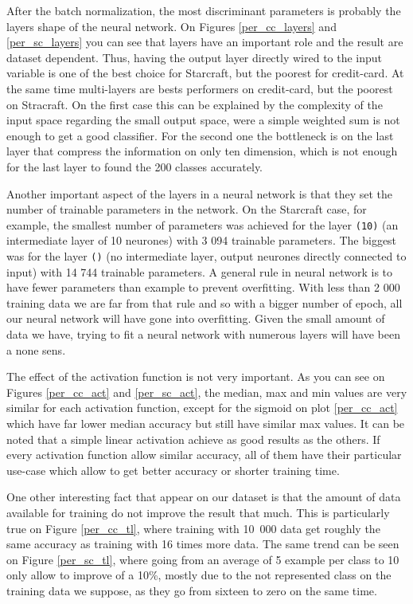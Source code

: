 \documentclass[twocolumn,a4paper,10pt]{article}
\begin{document}
After the batch normalization, the most discriminant parameters is
probably the layers shape of the neural network. On Figures \ref{per_cc_layers}
and \ref{per_sc_layers} you can see that layers have an important
role and the result are dataset dependent. Thus, having the output
layer directly wired to the input variable is one of the best choice
for Starcraft, but the poorest for credit-card. At the same time multi-layers
are bests performers on credit-card, but the poorest on Stracraft.
On the first case this can be explained by the complexity of the input
space regarding the small output space, were a simple weighted sum
is not enough to get a good classifier. For the second one the bottleneck
is on the last layer that compress the information on only ten dimension,
which is not enough for the last layer to found the 200 classes accurately.

Another important aspect of the layers in a neural network is that
they set the number of trainable parameters in the network. On the
Starcraft case, for example, the smallest number of parameters was
achieved for the layer \texttt{(10)} (an intermediate layer of 10
neurones) with 3 094 trainable parameters. The biggest was for the
layer \texttt{()} (no intermediate layer, output neurones directly
connected to input) with 14 744 trainable parameters. A general rule
in neural network is to have fewer parameters than example to prevent
overfitting. With less than 2 000 training data we are far from that
rule and so with a bigger number of epoch, all our neural network
will have gone into overfitting. Given the small amount of data we
have, trying to fit a neural network with numerous layers will have
been a none sens.

The effect of the activation function is not very important. As you
can see on Figures \ref{per_cc_act} and \ref{per_sc_act}, the median,
max and min values are very similar for each activation function,
except for the sigmoid on plot \ref{per_cc_act} which have far lower
median accuracy but still have similar max values. It can be noted
that a simple linear activation achieve as good results as the others.
If every activation function allow similar accuracy, all of them have
their particular use-case which allow to get better accuracy or shorter
training time.

One other interesting fact that appear on our dataset is that the amount
of data available for training do not improve the result that much.
This is particularly true on Figure \ref{per_cc_tl}, where training
with 10~000 data get roughly the same accuracy as training with 16
times more data. The same trend can be seen on Figure \ref{per_sc_tl},
where going from an average of 5 example per class to 10 only allow
to improve of a 10\%, mostly due to the not represented class on the
training data we suppose, as they go from sixteen to zero on the same
time.
\end{document}
